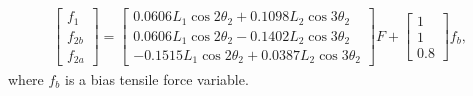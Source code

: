 \documentclass{llncs}
\begin{document}
\begin{align}
	\begin{bmatrix}
		f_1		\\
		f_{2b}	\\
		f_{2a}
	\end{bmatrix} = \begin{bmatrix}
		0.0606L_1\cos2\theta_2+0.1098L_2\cos3\theta_2	\\
		0.0606L_1\cos2\theta_2-0.1402L_2\cos3\theta_2	\\
		-0.1515L_1\cos2\theta_2+0.0387L_2\cos3\theta_2
	\end{bmatrix}F
	+\begin{bmatrix}
		1 \\
		1 \\
		0.8
	\end{bmatrix}f_b,\label{eq:independent-f}
\end{align}
where $f_b$ is a bias tensile force variable.
\end{document}

